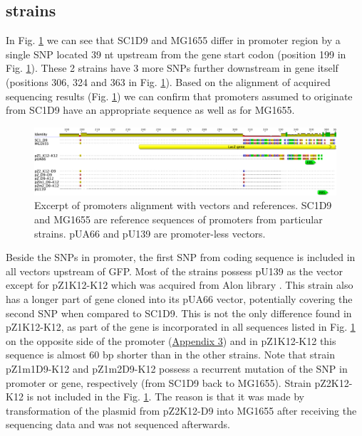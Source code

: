 \hypertarget{SeqRes}{\subsection{ strains}}
In Fig. \ref{placZ} we can see that SC1\textunderscore D9 and MG1655 differ in  promoter region by a single SNP located 39 nt upstream from the  gene start codon (position 199 in Fig. \ref{placZ}).
These 2 strains have 3 more SNPs further downstream in  gene itself 
(positions 306, 324 and 363 in Fig. \ref{placZ}).
Based on the alignment of acquired sequencing results (Fig. \ref{placZ}) we can confirm that  promoters assumed to originate from SC1\textunderscore D9 have an appropriate sequence as well as for MG1655.
\begin{figure}[b]
  \centering
  \includegraphics[scale=0.25]{text/Pictures/placZsequences.png}
    \caption{Excerpt of  promoters alignment with vectors and references. SC1\textunderscore D9 and MG1655 are reference sequences of  promoters from particular strains. pUA66 and pU139 are promoter-less vectors.}
    \label{placZ}
\end{figure}
Beside the SNPs in  promoter, the first SNP from  coding sequence is included in all vectors upstream of GFP.
Most of the strains possess pU139 as the vector except for pZ1\textunderscore K12-K12 which was acquired from Alon library \cite{zaslaver2006comprehensive}.
This strain also has a longer part of  gene cloned into its pUA66 vector, potentially covering the second SNP when compared to SC1\textunderscore D9.
This is not the only difference found in pZ1\textunderscore K12-K12, as part of the  gene is incorporated in all sequences listed in Fig. \ref{placZ} on the opposite side of the promoter (\hyperlink{placZalign}{Appendix 3}) and in pZ1\textunderscore K12-K12 this  sequence is almost 60 bp shorter than in the other strains.
Note that strain pZ1m1\textunderscore D9-K12 and pZ1m2\textunderscore D9-K12 possess a recurrent mutation of the SNP in  promoter or  gene, respectively (from SC1\textunderscore D9 back to MG1655).
Strain pZ2\textunderscore K12-K12 is not included in the Fig. \ref{placZ}.
The reason is that it was made by transformation of the plasmid from pZ2\textunderscore K12-D9 into MG1655 after receiving the sequencing data and was not sequenced afterwards.

